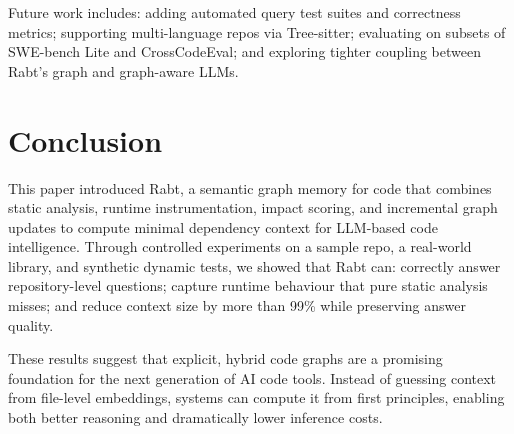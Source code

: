 \documentclass[11pt]{article}
\begin{document}
Future work includes:
adding automated query test suites and correctness metrics;
supporting multi-language repos via Tree-sitter;
evaluating on subsets of SWE-bench Lite and CrossCodeEval;
and exploring tighter coupling between Rabt's graph and graph-aware LLMs.

\section{Conclusion}

This paper introduced Rabt, a semantic graph memory for code that combines static analysis, runtime instrumentation, impact scoring, and incremental graph updates to compute minimal dependency context for LLM-based code intelligence.
Through controlled experiments on a sample repo, a real-world library, and synthetic dynamic tests, we showed that Rabt can:
correctly answer repository-level questions;
capture runtime behaviour that pure static analysis misses; and
reduce context size by more than 99\% while preserving answer quality.

These results suggest that explicit, hybrid code graphs are a promising foundation for the next generation of AI code tools.
Instead of guessing context from file-level embeddings, systems can compute it from first principles, enabling both better reasoning and dramatically lower inference costs.
\end{document}
